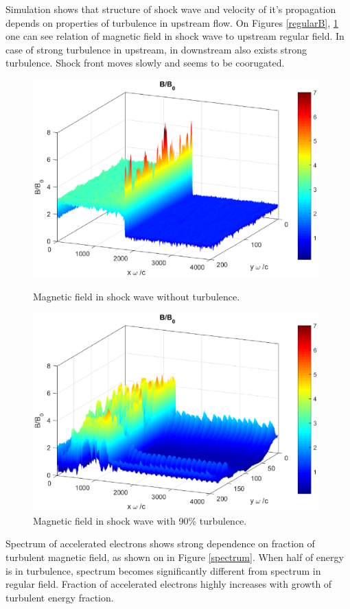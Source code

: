 \documentclass[a4paper]{jpconf}
\begin{document}
Simulation shows that structure of shock wave and velocity of it's propagation depends on properties of turbulence in upstream flow. On Figures \ref{regularB}, \ref{turbulentB} one can see relation of magnetic field in shock wave to upstream regular field. In case of strong turbulence in upstream, in downstream also exists strong turbulence. Shock front moves slowly and seems to be coorugated.

\begin{figure}[h!]
	\centering
	\begin{minipage}{0.49\textwidth}
		\centering
		\includegraphics[width=0.98\textwidth]{fig/regular_field.eps} 
		\caption{Magnetic field in shock wave without turbulence.}
		\label{regularB}
	\end{minipage}\hfill
	\begin{minipage}{0.49\textwidth}
		\centering
		\includegraphics[width=0.98\textwidth]{fig/turbulent_field.eps} 
		\caption{Magnetic field in shock wave with 90\% turbulence.}
		\label{turbulentB}
	\end{minipage}
\end{figure}
Spectrum of accelerated electrons shows strong dependence on fraction of turbulent magnetic field, as shown on in Figure \ref{spectrum}. When half of energy is in turbulence, spectrum becomes significantly different from spectrum in regular field. Fraction of accelerated electrons highly increases with growth of turbulent energy fraction. 
\end{document}
